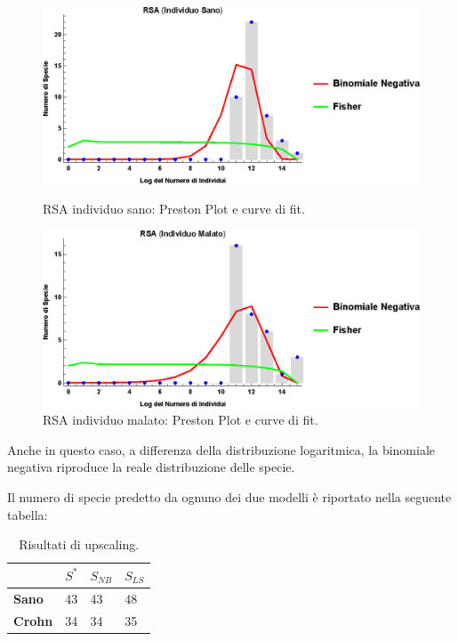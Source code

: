 \begin{figure}[H]
  \centering
  \begin{minipage}[b]{0.4\textwidth}
    \includegraphics[width=\textwidth]{Figure/rsaplotH.eps}
    \caption{RSA individuo sano: Preston Plot e curve di fit.}
    \label{fig:plotRSAH}
  \end{minipage}
  \hfill
  \begin{minipage}[b]{0.4\textwidth}
    \includegraphics[width=\textwidth]{Figure/rsaplotC.eps}
    \caption{RSA individuo malato: Preston Plot e curve di fit.}
    \label{fig:plotRSAC}
  \end{minipage}
\end{figure}

Anche in questo caso, a differenza della distribuzione logaritmica, la binomiale negativa riproduce la reale distribuzione delle specie.

Il numero di specie predetto da ognuno dei due modelli è riportato nella seguente tabella:

\begin{table}[H]
\centering
\begin{tabular}{l|l|l|l|}
\cline{2-4}
                                     & $S^*$ & $S_{NB}$ & $S_{LS}$ \\ \hline
\multicolumn{1}{|l|}{\textbf{Sano}}  & 43  & 43       & 48       \\ \hline
\multicolumn{1}{|l|}{\textbf{Crohn}} & 34  & 34       & 35       \\ \hline
\end{tabular}
\caption{Risultati di upscaling.}
\label{Tab:risultatiup}
\end{table}

